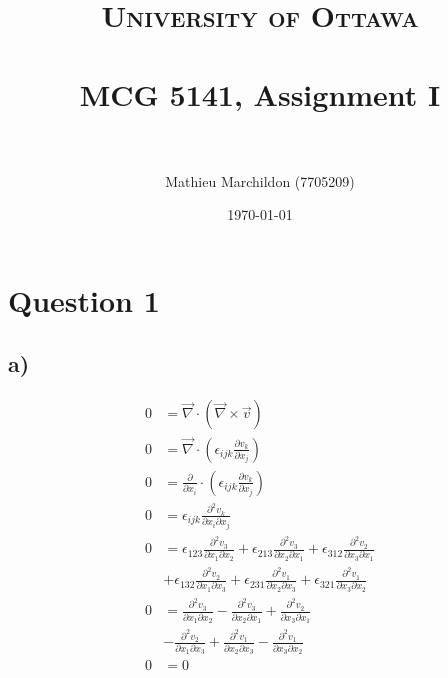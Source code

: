 \documentclass[paper=a4, fontsize=12pt]{scrartcl}
\title{	
	\normalfont \normalsize 
	\textsc{University of Ottawa} \\ [5pt]
	\horrule{0.5pt} \\[0.4cm] 
	\huge MCG 5141, Assignment I \\
	\horrule{2pt} \\[0.5cm] 
}
\author{Mathieu Marchildon (7705209)}
\date{\normalsize \today}
\begin{document}
\maketitle
	
\section*{Question 1}
\subsection*{a)}
\begin{align*}
0 &= \vec{\nabla} \cdot (\vec{\nabla} \times \vec{v} ) \\
0 &= \vec{\nabla} \cdot (\epsilon_{ijk} \frac{\partial v_k}{\partial x_j})\\
0 &= \frac{\partial}{\partial x_i} \cdot (\epsilon_{ijk} \frac{\partial v_k}{\partial x_j})\\
0 &= \epsilon_{ijk} \frac{\partial^2 v_k}{\partial x_i \partial x_j}\\
0 &= \epsilon_{123} \frac{\partial^2 v_3}{\partial x_1 \partial x_2} + \epsilon_{213} \frac{\partial^2 v_3}{\partial x_2 \partial x_1} + 
\epsilon_{312} \frac{\partial^2 v_2}{\partial x_3 \partial x_1}\\ 
 &+ \epsilon_{132} \frac{\partial^2 v_2}{\partial x_1 \partial x_3} 
  + \epsilon_{231} \frac{\partial^2 v_1}{\partial x_2 \partial x_3} 
  + \epsilon_{321} \frac{\partial^2 v_1}{\partial x_3 \partial x_2}\\
 0 &= \frac{\partial^2 v_3}{\partial x_1 \partial x_2} 
      -\frac{\partial^2 v_3}{\partial x_2 \partial x_1}
      +\frac{\partial^2 v_2}{\partial x_3 \partial x_1}\\
      &  -\frac{\partial^2 v_2}{\partial x_1 \partial x_3}
      	+\frac{\partial^2 v_1}{\partial x_2 \partial x_3}
      	- \frac{\partial^2 v_1}{\partial x_3 \partial x_2}\\
      	0 & =0 
\end{align*}
\end{document}
